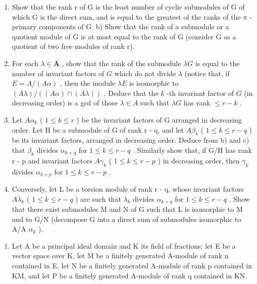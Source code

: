 \begin{enumerate}
\def\labelenumi{\alph{enumi})}
\item
  Show that the rank r of G is the least number of cyclic submodules of G of which G is the direct sum, and is equal to the greatest of the ranks of the \(\pi\) -primary components of G. b) Show that the rank of a submodule or a quotient module of G is at most equal to the rank of G (consider G as a quotient of two free modules of rank r).
\item
  For each \(\lambda \in \mathbf{A}\) , show that the rank of the submodule \(\lambda G\) is equal to the number of invariant factors of \(G\) which do not divide \(\lambda\) (notice that, if \(E = A / (A\alpha)\) , then the module \(\lambda E\) is isomorphic to \((A\lambda) / ((A\alpha) \cap (A\lambda))\) . Deduce that the \(k\) -th invariant factor of \(G\) (in decreasing order) is a gcd of those \(\lambda \in A\) such that \(\lambda G\) has rank \(\leqslant r - k\) .
\item
  Let \(A\alpha_{k}\) ( \(1 \leqslant k \leqslant r\) ) be the invariant factors of G arranged in decreasing order. Let H be a submodule of G of rank r - q, and let \(A\beta_{k}\) ( \(1 \leqslant k \leqslant r - q\) ) be its invariant factors, arranged in decreasing order. Deduce from b) and c) that \(\beta_{k}\) divides \(\alpha_{k+q}\) for \(1 \leqslant k \leqslant r - q\) . Similarly show that, if G/H has rank r - p and invariant factors \(A\gamma_{k}\) ( \(1 \leqslant k \leqslant r - p\) ) in decreasing order, then \(\gamma_{k}\) divides \(\alpha_{k+p}\) for \(1 \leqslant k \leqslant r - p\) .
\item
  Conversely, let L be a torsion module of rank r - q, whose invariant factors \(A\lambda_{k}\) ( \(1 \leqslant k \leqslant r - q\) ) are such that \(\lambda_{k}\) divides \(\alpha_{k+q}\) for \(1 \leqslant k \leqslant r - q\) . Show that there exist submodules M and N of G such that L is isomorphic to M and to G/N (decompose G into a direct sum of submodules isomorphic to A/A \(\alpha_{k}\) ).
\end{enumerate}

\begin{enumerate}
\def\labelenumi{\arabic{enumi})}
\setcounter{enumi}{8}
\tightlist
\item
  Let A be a principal ideal domain and K its field of fractions; let E be a vector space over K, let M be a finitely generated A-module of rank n contained in E, let N be a finitely generated A-module of rank p contained in KM, and let P be a finitely generated A-module of rank q contained in KN.
\end{enumerate}

